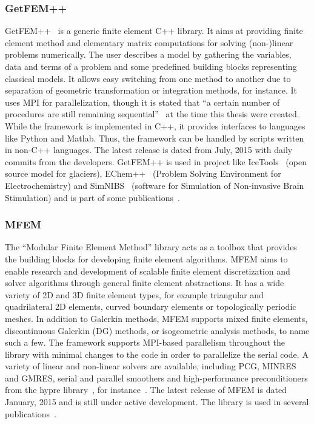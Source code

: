   \subsubsection{GetFEM++}
  GetFEM++~\cite{getfempp} is a generic finite element C++ library. It aims at providing finite element method and elementary matrix computations for solving (non-)linear problems numerically. The user describes a model by gathering the variables, data and terms of a problem and some predefined building blocks representing classical models. It allows easy switching from one method to another due to separation of geometric transformation or integration methods, for instance. It uses MPI for parallelization, though it is stated that ``a certain number of procedures are still remaining sequential''~\cite{getfemppMPI} at the time this thesis were created. While the framework is implemented in C++, it provides interfaces to languages like Python and Matlab. Thus, the framework can be handled by scripts written in non-C++ languages. The latest release is dated from July, 2015 with daily commits from the developers. GetFEM++ is used in project like IceTools~\cite{icetools} (open source model for glaciers), EChem++~\cite{echempp} (Problem Solving Environment for Electrochemistry) and SimNIBS~\cite{simnibs} (software for Simulation of Non-invasive Brain Stimulation) and is part of some publications~\cite{getfempp}.
  
  
  
  \subsubsection{MFEM}
  The ``Modular Finite Element Method'' library acts as a toolbox that provides the building blocks for developing finite element algorithms. MFEM aims to enable research and development of scalable finite element discretization and solver algorithms through general finite element abstractions. It has a wide variety of 2D and 3D finite element types, for example triangular and quadrilateral 2D elements, curved boundary elements or topologically periodic meshes. In addition to Galerkin methods, MFEM supports mixed finite elements, discontinuous Galerkin (DG) methods, or isogeometric analysis methods, to name such a few. The framework supports MPI-based parallelism throughout the library with minimal changes to the code in order to parallelize the serial code. A variety of linear and non-linear solvers are available, including PCG, MINRES and GMRES, serial and parallel smoothers and high-performance preconditioners from the hypre library~\cite{falgout2002hypre}, for instance~\cite{mfem}. The latest release of MFEM is dated January, 2015 and is still under active development. The library is used in several publications~\cite{mfemPubs}.
  
